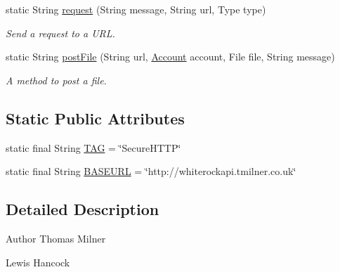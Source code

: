 \begin{DoxyCompactItemize}
static String \hyperlink{classuk_1_1ac_1_1swan_1_1digitaltrails_1_1utils_1_1_h_t_t_p_a79f0ab16505475a762da051a74c24af0}{request} (String message, String url, Type type)
\begin{DoxyCompactList}\small\item\em Send a request to a U\+R\+L. \end{DoxyCompactList}\item 
static String \hyperlink{classuk_1_1ac_1_1swan_1_1digitaltrails_1_1utils_1_1_h_t_t_p_af00ca465041f1c84bd7a59a077a61b8f}{post\+File} (String url, \hyperlink{classuk_1_1ac_1_1swan_1_1digitaltrails_1_1components_1_1_account}{Account} account, File file, String message)
\begin{DoxyCompactList}\small\item\em A method to post a file. \end{DoxyCompactList}\end{DoxyCompactItemize}
\subsection*{Static Public Attributes}
\begin{DoxyCompactItemize}
\item 
static final String \hyperlink{classuk_1_1ac_1_1swan_1_1digitaltrails_1_1utils_1_1_h_t_t_p_af0ea53de9d06c95f912175c13ecb89ba}{T\+A\+G} = \char`\"{}Secure\+H\+T\+T\+P\char`\"{}
\item 
static final String \hyperlink{classuk_1_1ac_1_1swan_1_1digitaltrails_1_1utils_1_1_h_t_t_p_adc7390074ee303b7a69c94c5e1fb0356}{B\+A\+S\+E\+U\+R\+L} = \char`\"{}http\+://whiterockapi.\+tmilner.\+co.\+uk\char`\"{}
\end{DoxyCompactItemize}


\subsection{Detailed Description}
\begin{DoxyAuthor}{Author}
Thomas Milner

Lewis Hancock 
\end{DoxyAuthor}


